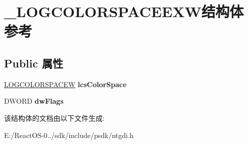 \hypertarget{struct___l_o_g_c_o_l_o_r_s_p_a_c_e_e_x_w}{}\section{\+\_\+\+L\+O\+G\+C\+O\+L\+O\+R\+S\+P\+A\+C\+E\+E\+X\+W结构体 参考}
\label{struct___l_o_g_c_o_l_o_r_s_p_a_c_e_e_x_w}
\subsection*{Public 属性}
\begin{DoxyCompactItemize}
\item 
\mbox{\label{struct___l_o_g_c_o_l_o_r_s_p_a_c_e_e_x_w_acdb5ef03b246880b22405160ba80acb6}} 
\hyperlink{structtag_l_o_g_c_o_l_o_r_s_p_a_c_e_w}{L\+O\+G\+C\+O\+L\+O\+R\+S\+P\+A\+C\+EW} {\bfseries lcs\+Color\+Space}
\item 
\mbox{\label{struct___l_o_g_c_o_l_o_r_s_p_a_c_e_e_x_w_a41888e93c15b7217d179bf8b8834a09d}} 
D\+W\+O\+RD {\bfseries dw\+Flags}
\end{DoxyCompactItemize}


该结构体的文档由以下文件生成\+:\begin{DoxyCompactItemize}
\item 
E\+:/\+React\+O\+S-\/0../sdk/include/psdk/ntgdi.\+h\end{DoxyCompactItemize}

